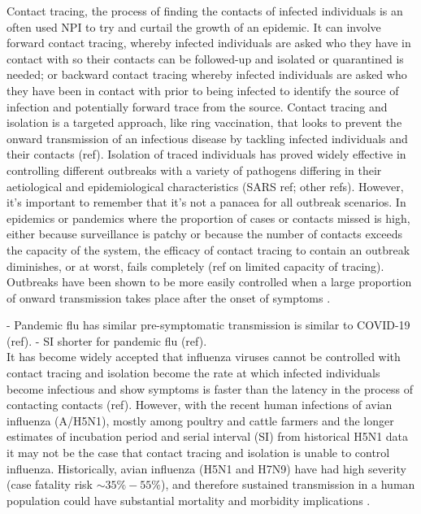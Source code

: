 \documentclass{article}
\begin{document}
Contact tracing, the process of finding the contacts of infected individuals is an often used NPI to try and curtail the growth of an epidemic. It can involve forward contact tracing, whereby infected individuals are asked who they have in contact with so their contacts can be followed-up and isolated or quarantined is needed; or backward contact tracing whereby infected individuals are asked who they have been in contact with prior to being infected to identify the source of infection and potentially forward trace from the source. Contact tracing and isolation is a targeted approach, like ring vaccination, that looks to prevent the onward transmission of an infectious disease by tackling infected individuals and their contacts \citep{kucharskiEffectivenessRingVaccination2016} (ref). Isolation of traced individuals has proved widely effective in controlling different outbreaks with a variety of pathogens differing in their aetiological and epidemiological characteristics (SARS ref; other refs). However, it's important to remember that it's not a panacea for all outbreak scenarios. In epidemics or pandemics where the proportion of cases or contacts missed is high, either because surveillance is patchy or because the number of contacts exceeds the capacity of the system, the efficacy of contact tracing to contain an outbreak diminishes, or at worst, fails completely \citep{dhillonWhenContactTracing2018} (ref on limited capacity of tracing). \\

Outbreaks have been shown to be more easily controlled when a large proportion of onward transmission takes place after the onset of symptoms \citep{fraserFactorsThatMake2004}.

- Pandemic flu has similar pre-symptomatic transmission is similar to COVID-19 (ref).
- SI shorter for pandemic flu (ref). \\

It has become widely accepted that influenza viruses cannot be controlled with contact tracing and isolation become the rate at which infected individuals become infectious and show symptoms is faster than the latency in the process of contacting contacts (ref). However, with the recent human infections of avian influenza (A/H5N1), mostly among poultry and cattle farmers and the longer estimates of incubation period and serial interval (SI) from historical H5N1 data \citep{Ward2024.12.11.24318702} it may not be the case that contact tracing and isolation is unable to control influenza. Historically, avian influenza (H5N1 and H7N9) have had high severity (case fatality risk $\sim 35\%-55\%$), and therefore sustained transmission in a human population could have substantial mortality and morbidity implications \citep{tannerPandemicPotentialAvian2015}. \\
\end{document}

